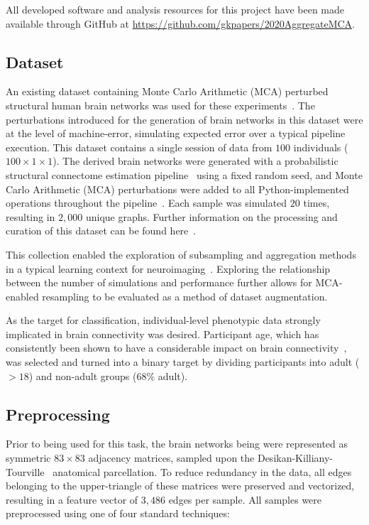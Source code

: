 \documentclass[10pt]{SelfArx} %
\begin{document}
All developed software and analysis resources for this project have been made available through GitHub at
\url{https://github.com/gkpapers/2020AggregateMCA}.

\subsection*{Dataset}

An existing dataset containing Monte Carlo Arithmetic (MCA) perturbed structural human brain networks was used for
these experiments~\cite{Kiar2020-yz}. The perturbations introduced for the generation of brain networks in this dataset
were at the level of machine-error, simulating expected error over a typical pipeline execution. This dataset contains
a single session of data from $100$ individuals ($100\times 1 \times1$). The derived brain networks were generated with
a probabilistic structural connectome estimation pipeline~\cite{Garyfallidis2014-ql} using a fixed random seed, and
Monte Carlo Arithmetic (MCA) perturbations were added to all Python-implemented operations throughout the
pipeline~\cite{Denis2016-wo,Parker1997-qq}. Each sample was simulated $20$ times, resulting in $2,000$ unique graphs.
Further information on the processing and curation of this dataset can be found here~\cite{Kiar2020-kz}.

This collection enabled the exploration of subsampling and aggregation methods in a typical learning context for
neuroimaging~\cite{Dimitriadis2017-pd,Buchanan2014-pm}. Exploring the relationship between the number of simulations
and performance further allows for MCA-enabled resampling to be evaluated as a method of dataset augmentation.

As the target for classification, individual-level phenotypic data strongly implicated in brain connectivity was
desired. Participant age, which has consistently been shown to have a considerable impact on brain
connectivity~\cite{Meier2012-ve,Wu2012-uc,Bookheimer2019-ti,Zhao2015-rm}, was selected and turned into a binary target
by dividing participants into adult ($>18$) and non-adult groups ($68\%$ adult). 

\subsection*{Preprocessing}
Prior to being used for this task, the brain networks being were represented as symmetric $83 \times 83$ adjacency
matrices, sampled upon the Desikan-Killiany-Tourville~\cite{Klein2012-vi} anatomical parcellation. To reduce redundancy
in the data, all edges belonging to the upper-triangle of these matrices were preserved and vectorized, resulting in a
feature vector of $3,486$ edges per sample. All samples were preprocessed using one of four standard techniques:
\end{document}

